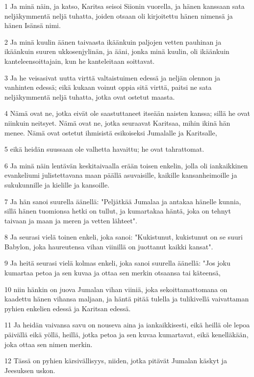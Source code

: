 \par 1 Ja minä näin, ja katso, Karitsa seisoi Siionin vuorella, ja hänen kanssaan sata neljäkymmentä neljä tuhatta, joiden otsaan oli kirjoitettu hänen nimensä ja hänen Isänsä nimi.
\par 2 Ja minä kuulin äänen taivaasta ikäänkuin paljojen vetten pauhinan ja ikäänkuin suuren ukkosenjylinän, ja ääni, jonka minä kuulin, oli ikäänkuin kanteleensoittajain, kun he kanteleitaan soittavat.
\par 3 Ja he veisasivat uutta virttä valtaistuimen edessä ja neljän olennon ja vanhinten edessä; eikä kukaan voinut oppia sitä virttä, paitsi ne sata neljäkymmentä neljä tuhatta, jotka ovat ostetut maasta.
\par 4 Nämä ovat ne, jotka eivät ole saastuttaneet itseään naisten kanssa; sillä he ovat niinkuin neitsyet. Nämä ovat ne, jotka seuraavat Karitsaa, mihin ikinä hän menee. Nämä ovat ostetut ihmisistä esikoiseksi Jumalalle ja Karitsalle,
\par 5 eikä heidän suussaan ole valhetta havaittu; he ovat tahrattomat.
\par 6 Ja minä näin lentävän keskitaivaalla erään toisen enkelin, jolla oli iankaikkinen evankeliumi julistettavana maan päällä asuvaisille, kaikille kansanheimoille ja sukukunnille ja kielille ja kansoille.
\par 7 Ja hän sanoi suurella äänellä: "Peljätkää Jumalaa ja antakaa hänelle kunnia, sillä hänen tuomionsa hetki on tullut, ja kumartakaa häntä, joka on tehnyt taivaan ja maan ja meren ja vetten lähteet".
\par 8 Ja seurasi vielä toinen enkeli, joka sanoi: "Kukistunut, kukistunut on se suuri Babylon, joka haureutensa vihan viinillä on juottanut kaikki kansat".
\par 9 Ja heitä seurasi vielä kolmas enkeli, joka sanoi suurella äänellä: "Jos joku kumartaa petoa ja sen kuvaa ja ottaa sen merkin otsaansa tai käteensä,
\par 10 niin hänkin on juova Jumalan vihan viiniä, joka sekoittamattomana on kaadettu hänen vihansa maljaan, ja häntä pitää tulella ja tulikivellä vaivattaman pyhien enkelien edessä ja Karitsan edessä.
\par 11 Ja heidän vaivansa savu on nouseva aina ja iankaikkisesti, eikä heillä ole lepoa päivällä eikä yöllä, heillä, jotka petoa ja sen kuvaa kumartavat, eikä kenelläkään, joka ottaa sen nimen merkin.
\par 12 Tässä on pyhien kärsivällisyys, niiden, jotka pitävät Jumalan käskyt ja Jeesuksen uskon.
